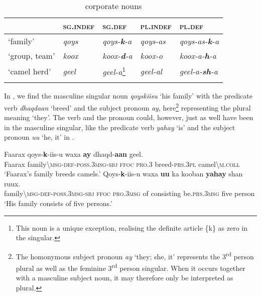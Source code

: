 \documentclass[output=paper]{langsci/langscibook}
\begin{document}
\begin{table}
\caption{ corporate nouns}
\label{tab:nilsson:14}
\begin{tabularx}{\textwidth}{XlXlX}
\lsptoprule
& {\textsc{sg.indef}}  & {\textsc{sg.def}} & {\textsc{pl.indef}} & {\textsc{pl.def}}\\
\midrule 
{‘family’} & {\textit{qoys}} &  {\textit{qoys-}\textbf{\textit{k}}\textit{-a}} & {\textit{qoys-as}} & {\textit{qoys-as-}\textbf{\textit{k}}\textit{-a}}\\
{‘group, team’} & {\textit{koox}} &  {\textit{koox-}\textbf{\textit{d}}\textit{-a}} & {\textit{koox-o}} & {\textit{koox-a-}\textbf{\textit{h}}\textit{-a}}\\
{‘camel herd’} & {\textit{geel}} &  {\textit{geel-a}}\footnote{This noun is a unique exception, realising the definite article \{k\} as zero in the singular.} & {\textit{geel-al}} & {\textit{geel-a-}\textbf{\textit{sh}}\textit{-a}}\\
\lspbottomrule
\end{tabularx}

\end{table} 


  
In , we find the masculine singular noun \textit{qoyskiisu} ‘his family’ with the predicate verb \textit{dhaqdaan} ‘breed’ and the subject pronoun \textit{ay}, here\footnote{The homonymous subject pronoun \textit{ay} ‘they; she, it’ represents the 3\textsuperscript{rd} person plural as well as the feminine 3\textsuperscript{rd} person singular. When it occurs together with a masculine subject noun, it may therefore only be interpreted as plural.} representing the plural meaning ‘they’. The verb and the pronoun could, however, just as well have been in the masculine singular, like the predicate verb \textit{yahay} ‘is’ and the subject pronoun \textit{uu} ‘he, it’ in .

\ea\label{ex:nilsson:8}
\gll Faarax  qoys-\textbf{k}-iis-u        waxa  \textbf{ay}    dhaqd-\textbf{aan}  geel.\\
     Faarax  family{\textbackslash}\textsc{msg-def-poss.3msg-sbj}    \textsc{ffoc}  \textsc{pro.3}  breed-\textsc{prs.3pl}  camel{\textbackslash}\textsc{m.coll}\\
\glt ‘Faarax’s family breeds camels.’
\z 
\ea\label{ex:nilsson:9}
\gll Qoys-\textbf{k}-iis-u      waxa  \textbf{uu}    ka  kooban    \textbf{yahay}    shan  ruux.\\
     family{\textbackslash}\textsc{msg-def-poss.3msg-sbj}  \textsc{ffoc}  \textsc{pro.3msg}  of  consisting  be.\textsc{prs.3msg}  five  person\\
\glt ‘His family consists of five persons.’
\z
\end{document}
